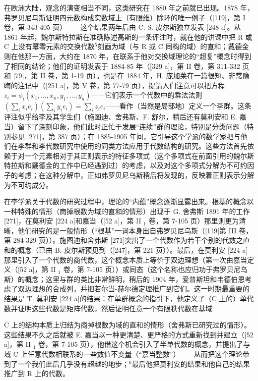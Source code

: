 在欧洲大陆，观念的演变相当不同，这类研究在 1880 年之前就已出现。1878 年，弗罗贝尼乌斯证明四元数构成实数域上（有限维）除环的唯一例子（{[}119{]}，第 I 卷，第 343-405 页）——这个结果两年后由 C. S. 皮尔斯独立发表 {[}248 d{]}。从 1861 年起，魏尔斯特拉斯在准确陈述高斯的一条评注时，就在他的讲课中把 R 或 C 上没有幂零元素的交换代数\(^{5}\)刻画为域（与 R 或 C 同构的域）的直和；戴德金则在他那一方面，大约在 1870 年，在联系于他对交换域理论的“超复”概念时得到了相同的结论；他们的证明发表于 1884-85 年（{[}329 a{]}，第 II 卷，第 311-332 页和 {[}79{]}，第 II 卷，第 1-19 页）。也是在 1884 年，H. 庞加莱在一篇很短、非常隐晦的注记中（{[}251 a{]}，第 V 卷，第 77-79 页），提请人们注意可以把方程 \(z_{i} = \phi_{i}(x_{1}, \ldots, x_{n}, y_{1}, \ldots, y_{n})\)——它们表示一个代数中的乘法法则 \((\sum_{i} x_{i} e_{i})(\sum_{i} y_{i} e_{i}) = \sum_{i} z_{i} e_{i}\)——看作（当然是局部地）定义一个李群。这条评注似乎给李及其学生们（施图迪、舍弗斯、F. 舒尔，稍后还有莫利安和 E. 嘉当）留下了深刻印象，他们此时正忙于发展“连续”群的理论，特别是分类问题（特别参见 {[}271{]}，第 387 页）；在 1885-1905 年间，它引导这个学派的数学家把与他们在李群和李代数研究中使用的同类方法应用于代数结构的研究。这些方法首先依赖于对一个元素相对于其正则表示的特征多项式（这个多项式在前面引用的魏尔斯特拉斯和戴德金的工作中已经遇到过）的考虑，以及对这个多项式分解为不可约因子的考虑；在这种分解中，正如弗罗贝尼乌斯稍后将发现的，反映着正则表示分解为不可约成分。

在李学派关于代数的研究过程中，理论的“内蕴”概念逐渐显露出来。根基的概念以一种特殊的情形（商掉根数为域的直和的情形）出现于 G. 舍弗斯 1891 年的工作 {[}271{]}，在莫利安 {[}224 a{]}和嘉当（{[}52 a{]}，第 II \(_{1}\) 卷，第 7-105 页）那里则更为清晰，他们研究的是一般情形（“根基”一词本身出自弗罗贝尼乌斯（{[}119{]}第 III 卷，第 284-329 页））。施图迪和舍弗斯 {[}271{]}突出了一个代数作为若干个别的代数之直和的概念（已由 B. 皮尔斯预见到（{[}247{]}，第 221 页））。最后，在莫利安 {[}224 a{]}那里引入了一个代数的商代数，这个概念本质上等价于双边理想（第一次由嘉当定义（{[}52 a{]}，第 II \(_{1}\) 卷，第 7-105 页））或同态（这个名称也应归功于弗罗贝尼乌斯）的概念；这里与群的类比非常鲜明，稍后的 1904 年，爱普斯坦和韦德伯恩考虑了双边理想的合成列，并把若尔当-赫尔德定理推广到它们。这一时期最重要的结果是 T. 莫利安 {[}224 a{]}的结果：在单群概念的指引下，他定义了（C 上的）单代数并证明这些代数是矩阵代数，然后证明任意一个有限秩代数在基域

C 上的结构本质上归结为商掉根数为域的直和的情形（舍弗斯已研究过的情形）。这些结果不久之后就被 E. 嘉当以一种更清楚、更严格的方式重新找到并建立（{[}52 a{]}，第 II \(_{1}\) 卷，第 7-105 页），他借这个机会引入了半单代数的概念，并提出了与域 C 上任意代数相联系的一些数值不变量（“嘉当整数”）——从而把这个理论带到了一个我们此后几乎没有超越的地步；\(^{6}\)最后他把莫利安的结果和他自己的结果推广到 R 上的代数。

